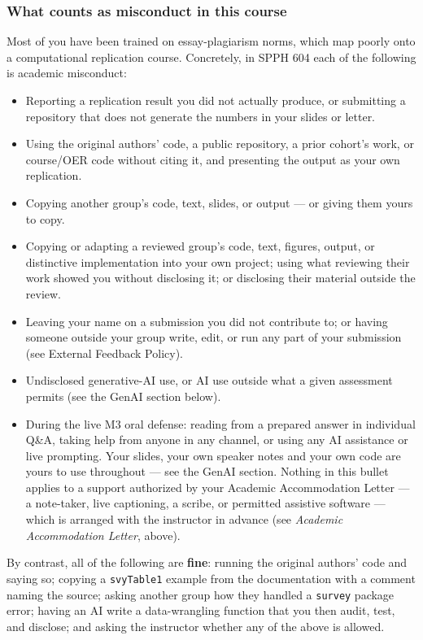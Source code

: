 \documentclass[
]{article}
\providecommand{\tightlist}{%
  \setlength{\itemsep}{0pt}\setlength{\parskip}{0pt}}
\begin{document}
\subsubsection{What counts as misconduct in this
course}\label{what-counts-as-misconduct-in-this-course}

Most of you have been trained on essay-plagiarism norms, which map
poorly onto a computational replication course. Concretely, in SPPH 604
each of the following is academic misconduct:

\begin{itemize}
\tightlist
\item
  Reporting a replication result you did not actually produce, or
  submitting a repository that does not generate the numbers in your
  slides or letter.
\item
  Using the original authors' code, a public repository, a prior
  cohort's work, or course/OER code without citing it, and presenting
  the output as your own replication.
\item
  Copying another group's code, text, slides, or output --- or giving
  them yours to copy.
\item
  Copying or adapting a reviewed group's code, text, figures, output, or
  distinctive implementation into your own project; using what reviewing
  their work showed you without disclosing it; or disclosing their
  material outside the review.
\item
  Leaving your name on a submission you did not contribute to; or having
  someone outside your group write, edit, or run any part of your
  submission (see External Feedback Policy).
\item
  Undisclosed generative-AI use, or AI use outside what a given
  assessment permits (see the GenAI section below).
\item
  During the live M3 oral defense: reading from a prepared answer in
  individual Q\&A, taking help from anyone in any channel, or using any
  AI assistance or live prompting. Your slides, your own speaker notes
  and your own code are yours to use throughout --- see the GenAI
  section. Nothing in this bullet applies to a support authorized by
  your Academic Accommodation Letter --- a note-taker, live captioning,
  a scribe, or permitted assistive software --- which is arranged with
  the instructor in advance (see \emph{Academic Accommodation Letter},
  above).
\end{itemize}

By contrast, all of the following are \textbf{fine}: running the
original authors' code and saying so; copying a \texttt{svyTable1}
example from the documentation with a comment naming the source; asking
another group how they handled a \texttt{survey} package error; having
an AI write a data-wrangling function that you then audit, test, and
disclose; and asking the instructor whether any of the above is allowed.
\end{document}
